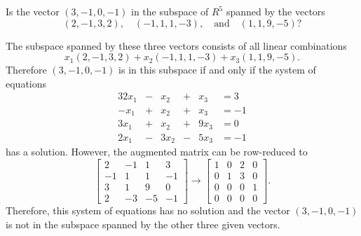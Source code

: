  Is the vector $(3,-1,0,-1)$ in the subspace of $R^5$
spanned by the vectors
\begin{equation*}
  (2,-1,3,2), \quad
  (-1,1,1,-3),
  \quad\text{and}\quad
  (1,1,9,-5)?
\end{equation*}
\begin{solution}
  The subspace spanned by these three vectors consists of all linear
  combinations
  \begin{equation*}
    x_1(2,-1,3,2) + x_2(-1,1,1,-3) + x_3(1,1,9,-5).
  \end{equation*}
  Therefore $(3,-1,0,-1)$ is in this subspace if and only if the
  system of equations
  \begin{alignat*}{3}
    2x_1 &{}-{}& x_2 &{}+{}& x_3 &{}= 3 \\
    -x_1 &{}+{}& x_2 &{}+{}& x_3 &{}= -1 \\
    3x_1 &{}+{}& x_2 &{}+{}& 9x_3 &{}= 0 \\
    2x_1 &{}-{}& 3x_2 &{}-{}& 5x_3 &{}= -1
  \end{alignat*}
  has a solution. However, the augmented matrix can be row-reduced to
  \begin{equation*}
    \begin{bmatrix}
      2 & -1 & 1 & 3 \\
      -1 & 1 & 1 & -1 \\
      3 & 1 & 9 & 0 \\
      2 & -3 & -5 & -1
    \end{bmatrix}
    \rightarrow
    \begin{bmatrix}
      1 & 0 & 2 & 0 \\
      0 & 1 & 3 & 0 \\
      0 & 0 & 0 & 1 \\
      0 & 0 & 0 & 0
    \end{bmatrix}.
  \end{equation*}
  Therefore, this system of equations has no solution and the vector
  $(3,-1,0,-1)$ is not in the subspace spanned by the other three
  given vectors.
\end{solution}

